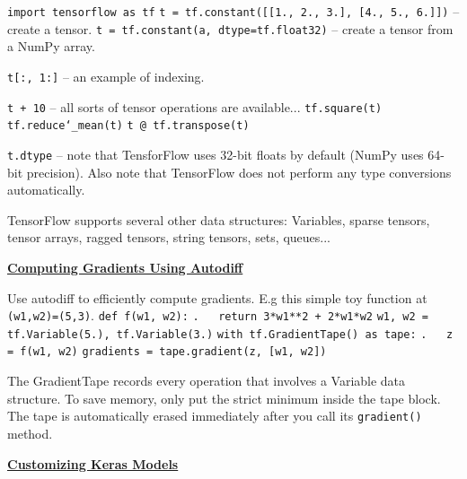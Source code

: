 \texttt{import tensorflow as tf}\newline
\texttt{t = tf.constant([[1., 2., 3.], [4., 5., 6.]])} -- create a tensor.\newline
\texttt{t = tf.constant(a, dtype=tf.float32)} -- create a tensor from a NumPy array.

\texttt{t[:, 1:]} -- an example of indexing.

\texttt{t + 10} -- all sorts of tensor operations are available...\newline
\texttt{tf.square(t)}\newline
\texttt{tf.reduce\char`_mean(t)}\newline
\texttt{t @ tf.transpose(t)}

\texttt{t.dtype} -- note that TensforFlow uses 32-bit floats by default (NumPy uses 64-bit precision).\newline
Also note that TensorFlow does not perform any type conversions automatically.

TensorFlow supports several other data structures:\newline
Variables, sparse tensors, tensor arrays, ragged tensors, string tensors, sets, queues...\newline

\textbf{\underline{Computing Gradients Using Autodiff}}

Use autodiff to efficiently compute gradients. E.g this simple toy function at \texttt{(w1,w2)=(5,3)}.\newline
\texttt{def f(w1, w2):}\newline
\texttt{.~~~return 3*w1**2 + 2*w1*w2}\newline
\texttt{}\newline
\texttt{w1, w2 = tf.Variable(5.), tf.Variable(3.)}\newline
\texttt{with tf.GradientTape() as tape:}\newline
\texttt{.~~~z = f(w1, w2)}\newline
\texttt{gradients = tape.gradient(z, [w1, w2])}

The GradientTape records every operation that involves a Variable data structure.\newline
To save memory, only put the strict minimum inside the tape block.\newline
The tape is automatically erased immediately after you call its \texttt{gradient()} method.\newline

\textbf{\underline{Customizing Keras Models}}

